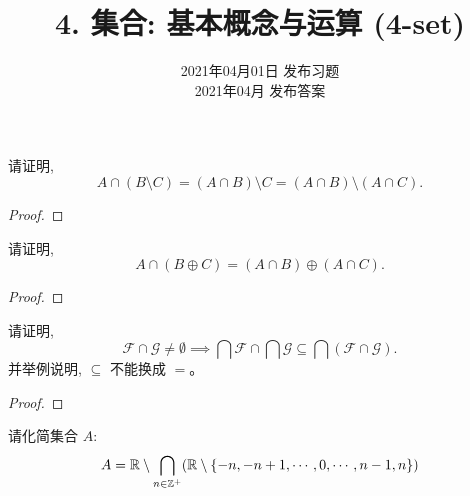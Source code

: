 \documentclass[a4paper, justified]{tufte-handout}
\title{4. 集合: 基本概念与运算 (4-set)}
\date{2021年04月01日 发布习题\\ 2021年04月 发布答案}
\begin{document}
\maketitle
\noplagiarism %
\begin{abstract}
\end{abstract}
\beginrequired

\begin{problem}
  请证明,
  \[
    A \cap (B \setminus C) = (A \cap B) \setminus C
                            = (A \cap B) \setminus (A \cap C).
  \]
\end{problem}

\begin{proof}
\end{proof}

\begin{problem}
  请证明,
  \[
    A \cap (B \oplus C) = (A \cap B) \oplus (A \cap C).
  \]
\end{problem}

\begin{proof}
\end{proof}

\begin{problem}
  请证明,
  \[
    \mathcal{F} \cap \mathcal{G} \neq \emptyset \implies
      \bigcap \mathcal{F} \cap \bigcap \mathcal{G} \subseteq \bigcap (\mathcal{F} \cap \mathcal{G}).
  \]
  并举例说明, $\subseteq$ 不能换成 $=$。
\end{problem}

\begin{proof}
\end{proof}

\begin{problem}
  请化简集合 $A$:
  \[
    A = \mathbb{R} \setminus \bigcap_{n \in \mathbb{Z}^{+}} (\mathbb{R} \setminus \{-n, -n+1, \cdots, 0, \cdots, n-1, n\})
  \]
\end{problem}
\end{document}
